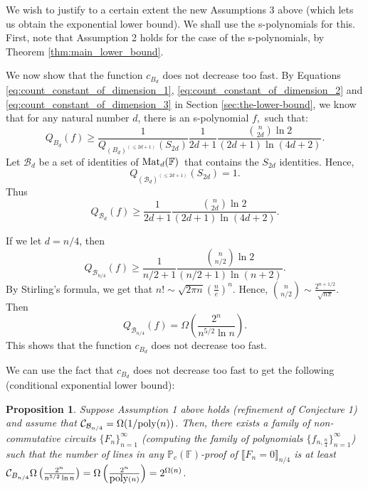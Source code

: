 \documentclass[12pt,reqno]{article}
\newtheorem{proposition}[theorem]{Proposition}
\newcommand\F{\ensuremath{\mathbb F}}
\newcommand\PP{{\mathbb P}}
\newcommand\PC{\ensuremath{\PP_c}}
\newcommand{\poly}{\hbox{poly}}
\newcommand{\matd}{{\ensuremath{{\rm Mat}_d(\F)}}}
\newcommand{\iddofix}[2][]
{\todo[inline, size=\footnotesize, caption={#2}, #1, linecolor=green!70!white,         backgroundcolor=red!30!white,bordercolor=white]
{{#2}}}
\newcommand{\degr}[2]{\left(#1\right)^{(#2)}}
\begin{document}
We wish to justify to a certain extent the new Assumptions 3 above (which lets us obtain the exponential lower bound). We shall use the s-polynomials for this. First, note that Assumption 2 holds for the case of the  s-polynomials, by Theorem \ref{thm:main_lower_bound}.


 We now show that the function $c_{B_d}$ does not decrease too fast. By Equations \ref{eq:count_constant_of_dimension_1}, \ref{eq:count_constant_of_dimension_2}
and \ref{eq:count_constant_of_dimension_3} in
Section \ref{sec:the-lower-bound}, we know that for any natural number $d$, there is an s-polynomial $f,$ such that:
$$Q_{B_d}(f)\geq \frac{1}{Q_{\degr{ B_d}{\leq 2d+1}}(S_{2d})}\frac{1}{2d+1}\frac{{n\choose {2d}}\ln 2}{(2d+1)\ln (4d+2)}.$$
Let $\mathcal B_{d}$ be a set of identities of \matd\  that contains the $S_{2d}$ identities.
Hence, $$Q_{ \degr{ \mathcal B_{d}}{ \leq 2d+1 }} (S_{2d})=1.$$
Thus
$$Q_{\mathcal B_d}(f)\geq \frac{1}{2d+1}\frac{{n\choose {2d}}\ln 2}{(2d+1)\ln (4d+2)}.$$


If we let $d=n/4$, then
$$Q_{\mathcal B_{n/4}}(f)\geq \frac{1}{n/2+1}\frac{{n\choose {n/2}}\ln 2}{(n/2+1)\ln (n+2)}.$$
By Stirling's formula, we get that $n!\sim\sqrt{2\pi n}(\frac{n}{e})^n$. Hence,
${n\choose n/2}\sim \frac{2^{n+1/2}}{\sqrt{n\pi}}$. Then $$Q_{\mathcal B_{n/4}}(f)=\Omega\left(\frac{2^n}{n^{5/2}\ln n}\right).$$
This shows that the function \(c_{B_{d}}\) does not decrease too fast.

\bigskip

We can use the fact that \(c_{B_{d}}\) does not decrease too fast to get the following (conditional exponential lower bound):



\begin{proposition}
Suppose \emph{Assumption 1} above holds (refinement of Conjecture 1) and assume that $\mathcal C_{\mathcal B_{n/4}}=
\Omega(1/{\rm poly}(n))$. Then, there exists a  family of
non-commutative circuits $\{F_n\}_{n=1}^\infty$ (computing the family of polynomials
$\{f_{n,\frac{n}{4}}\}_{n=1}^\infty$)
such that  the number of lines in any $\PC(\F)$-proof of $\llbracket F_n= 0\rrbracket_{n/4}$ is at least
$\mathcal C_{B_{n/4}}\Omega\left(\frac{2^n}{n^{5/2}\ln n}\right)=\Omega
\left(\frac{2^n}{\poly(n)}\right)=2^{\Omega(n)}$.
\end{proposition} \iddofix{check this ln in denominator}
\end{document}
